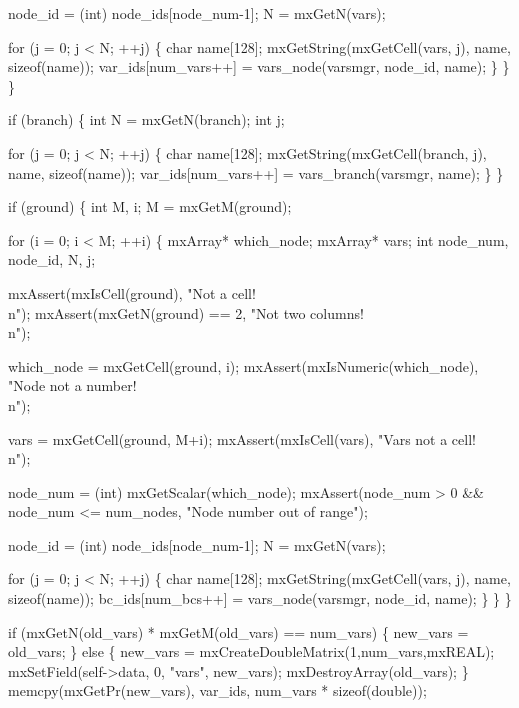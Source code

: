             node_id = (int) node_ids[node_num-1];
            N = mxGetN(vars);

            for (j = 0; j < N; ++j) \{
                char name[128];
                mxGetString(mxGetCell(vars, j), name, sizeof(name));
                var_ids[num_vars++] = vars_node(varsmgr, node_id, name);
            \}
        \}
    \}

    if (branch) \{
        int N = mxGetN(branch);
        int j;

        for (j = 0; j < N; ++j) \{
            char name[128];
            mxGetString(mxGetCell(branch, j), name, sizeof(name));
            var_ids[num_vars++] = vars_branch(varsmgr, name);
        \}
    \}

    if (ground) \{
        int M, i;
        M = mxGetM(ground);

        for (i = 0; i < M; ++i) \{
            mxArray* which_node;
            mxArray* vars;
            int node_num, node_id, N, j;

            mxAssert(mxIsCell(ground), "Not a cell!\\n");
            mxAssert(mxGetN(ground) == 2, "Not two columns!\\n");

            which_node = mxGetCell(ground, i);
            mxAssert(mxIsNumeric(which_node), "Node not a number!\\n");

            vars = mxGetCell(ground, M+i);
            mxAssert(mxIsCell(vars), "Vars not a cell!\\n");

            node_num = (int) mxGetScalar(which_node);
            mxAssert(node_num > 0 && node_num <= num_nodes,
                     "Node number out of range");

            node_id = (int) node_ids[node_num-1];
            N = mxGetN(vars);
 
            for (j = 0; j < N; ++j) \{
                char name[128];
                mxGetString(mxGetCell(vars, j), name, sizeof(name));
                bc_ids[num_bcs++] = vars_node(varsmgr, node_id, name);
            \}
        \}
    \}

    if (mxGetN(old_vars) * mxGetM(old_vars) == num_vars) \{
        new_vars = old_vars;
    \} else \{
        new_vars = mxCreateDoubleMatrix(1,num_vars,mxREAL);
        mxSetField(self->data, 0, "vars", new_vars);
        mxDestroyArray(old_vars);
    \}
    memcpy(mxGetPr(new_vars), var_ids, num_vars * sizeof(double));


